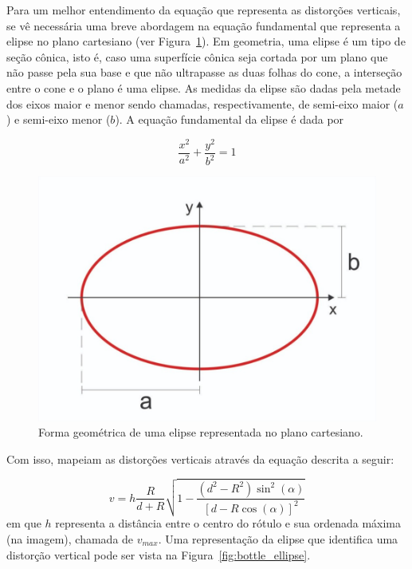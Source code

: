  
Para um melhor entendimento da equação que representa as distorções verticais, se vê necessária uma breve abordagem na equação fundamental que representa a elipse no plano cartesiano (ver Figura~\ref{fig:ellipse_imagem}). Em geometria, uma elipse é um tipo de seção cônica, isto é, caso uma superfície cônica seja cortada por um plano que não passe pela sua base e que não ultrapasse as duas folhas do cone, a interseção entre o cone e o plano é uma elipse. As medidas da elipse são dadas pela metade dos eixos maior e menor sendo chamadas, respectivamente, de semi-eixo maior ($a$) e semi-eixo menor ($b$). A equação fundamental da elipse é dada por

\begin{equation}
    \frac{x^2}{a^2} + \frac{y^2}{b^2} = 1
    \label{equacao:ellipse}
\end{equation}

\begin{figure}[htb]
    \caption{Forma geométrica de uma elipse representada no plano cartesiano.}
    \centering
    \begin{minipage}{.5\textwidth}
      \centering
         \includegraphics[width=.95\linewidth]{TCC/Imagens/ellipse_imagem.jpg}
	\end{minipage}
    \label{fig:ellipse_imagem}
\end{figure}

Com isso, \citet*{Lin:2013} mapeiam as distorções verticais através da equação descrita a seguir:

\begin{equation}
    v = h \frac{R}{d+R} \sqrt{1 - \frac{(d^2 - R^2)\sin^2{(\alpha)}}{[d - R\cos{ (\alpha)}]^2}}
    \label{equacao:dist_vert}
\end{equation}
em que $h$ representa a distância entre o centro do rótulo e sua ordenada máxima (na imagem), chamada de $v_{max}$. Uma representação da elipse que identifica uma distorção vertical pode ser vista na Figura~\ref{fig:bottle_ellipse}.


